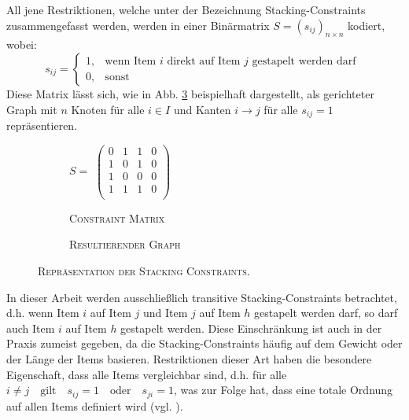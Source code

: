 All jene Restriktionen, welche unter der Bezeichnung Stacking-Constraints zusammengefasst werden,
werden in einer Binärmatrix $S = (s_{ij})_{n \times n}$ kodiert, wobei:
\[
    s_{ij} =
\begin{cases}
    1, & \text{wenn Item $i$ direkt auf Item $j$ gestapelt werden darf }\\
    0, & \text{sonst}
\end{cases}
\]
Diese Matrix lässt sich, wie in Abb. \ref{fig:matrix_to_graph} beispielhaft dargestellt,
als gerichteter Graph mit $n$ Knoten für alle $i \in I$ und Kanten $i \rightarrow j$ für alle $s_{ij} = 1$ repräsentieren.
\begin{figure}[H]
  \begin{subfigure}[b]{0.5\textwidth}
  \centering
    $S =$
    $\left(
    \begin{array}{rrrr}
    0 & 1 & 1 & 0 \\
    1 & 0 & 1 & 0 \\
    1 & 0 & 0 & 0 \\
    1 & 1 & 1 & 0 \\
    \end{array} \right) $
    \caption{\textsc{Constraint Matrix}}
    \label{fig:constraint_matrix}
  \end{subfigure}
  \hfill
  \begin{subfigure}[b]{0.5\textwidth}
  \centering
    \caption{\textsc{Resultierender Graph}}
    \label{fig:resulting_graph}
  \end{subfigure}
  \caption{\textsc{Repräsentation der Stacking Constraints.}}
  \label{fig:matrix_to_graph}
\end{figure}
In dieser Arbeit werden ausschließlich transitive Stacking-Constraints betrachtet, d.h.
wenn Item $i$ auf Item $j$ und Item $j$ auf Item $h$ gestapelt werden darf,
so darf auch Item $i$ auf Item $h$ gestapelt werden.\newline
Diese Einschränkung ist auch in der Praxis zumeist gegeben, da die Stacking-Constraints häufig auf dem Gewicht
oder der Länge der Items basieren. Restriktionen dieser Art haben die besondere Eigenschaft, dass alle Items vergleichbar sind, d.h. für alle $i \neq j  \quad \text{gilt} \quad s_{ij} = 1 \quad \text{oder} \quad s_{ji} = 1$, was zur Folge hat,
dass eine totale Ordnung auf allen Items definiert wird (vgl. \citet{Bruns2015}).

